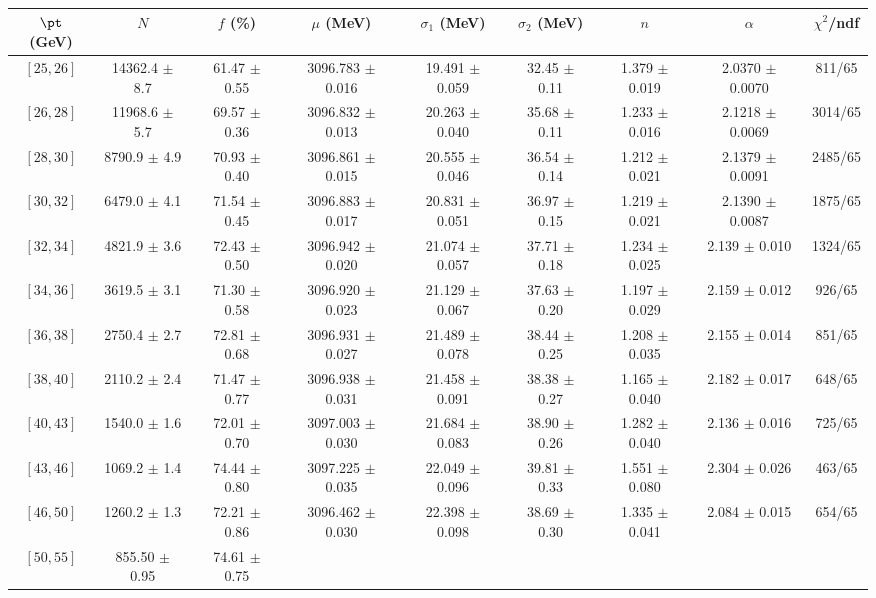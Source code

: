 \begin{tabular}{c||c|c|c|c|c|c|c||c}
$\pt$ (GeV) & $N$ & $f$ (\%) & $\mu$ (MeV) & $\sigma_1$ (MeV) & $\sigma_2$ (MeV) & $n$ &  $\alpha$ & $\chi^2$/ndf \\
\hline
$[25, 26]$ & 14362.4 $\pm$ 8.7 & 
61.47 $\pm$ 0.55 & 
3096.783 $\pm$ 0.016 & 
19.491 $\pm$ 0.059 & 
32.45 $\pm$ 0.11 & 
1.379 $\pm$ 0.019 & 
2.0370 $\pm$ 0.0070 & 
811/65\\
$[26, 28]$ & 11968.6 $\pm$ 5.7 & 
69.57 $\pm$ 0.36 & 
3096.832 $\pm$ 0.013 & 
20.263 $\pm$ 0.040 & 
35.68 $\pm$ 0.11 & 
1.233 $\pm$ 0.016 & 
2.1218 $\pm$ 0.0069 & 
3014/65\\
$[28, 30]$ & 8790.9 $\pm$ 4.9 & 
70.93 $\pm$ 0.40 & 
3096.861 $\pm$ 0.015 & 
20.555 $\pm$ 0.046 & 
36.54 $\pm$ 0.14 & 
1.212 $\pm$ 0.021 & 
2.1379 $\pm$ 0.0091 & 
2485/65\\
$[30, 32]$ & 6479.0 $\pm$ 4.1 & 
71.54 $\pm$ 0.45 & 
3096.883 $\pm$ 0.017 & 
20.831 $\pm$ 0.051 & 
36.97 $\pm$ 0.15 & 
1.219 $\pm$ 0.021 & 
2.1390 $\pm$ 0.0087 & 
1875/65\\
$[32, 34]$ & 4821.9 $\pm$ 3.6 & 
72.43 $\pm$ 0.50 & 
3096.942 $\pm$ 0.020 & 
21.074 $\pm$ 0.057 & 
37.71 $\pm$ 0.18 & 
1.234 $\pm$ 0.025 & 
2.139 $\pm$ 0.010 & 
1324/65\\
$[34, 36]$ & 3619.5 $\pm$ 3.1 & 
71.30 $\pm$ 0.58 & 
3096.920 $\pm$ 0.023 & 
21.129 $\pm$ 0.067 & 
37.63 $\pm$ 0.20 & 
1.197 $\pm$ 0.029 & 
2.159 $\pm$ 0.012 & 
926/65\\
$[36, 38]$ & 2750.4 $\pm$ 2.7 & 
72.81 $\pm$ 0.68 & 
3096.931 $\pm$ 0.027 & 
21.489 $\pm$ 0.078 & 
38.44 $\pm$ 0.25 & 
1.208 $\pm$ 0.035 & 
2.155 $\pm$ 0.014 & 
851/65\\
$[38, 40]$ & 2110.2 $\pm$ 2.4 & 
71.47 $\pm$ 0.77 & 
3096.938 $\pm$ 0.031 & 
21.458 $\pm$ 0.091 & 
38.38 $\pm$ 0.27 & 
1.165 $\pm$ 0.040 & 
2.182 $\pm$ 0.017 & 
648/65\\
$[40, 43]$ & 1540.0 $\pm$ 1.6 & 
72.01 $\pm$ 0.70 & 
3097.003 $\pm$ 0.030 & 
21.684 $\pm$ 0.083 & 
38.90 $\pm$ 0.26 & 
1.282 $\pm$ 0.040 & 
2.136 $\pm$ 0.016 & 
725/65\\
$[43, 46]$ & 1069.2 $\pm$ 1.4 & 
74.44 $\pm$ 0.80 & 
3097.225 $\pm$ 0.035 & 
22.049 $\pm$ 0.096 & 
39.81 $\pm$ 0.33 & 
1.551 $\pm$ 0.080 & 
2.304 $\pm$ 0.026 & 
463/65\\
$[46, 50]$ & 1260.2 $\pm$ 1.3 & 
72.21 $\pm$ 0.86 & 
3096.462 $\pm$ 0.030 & 
22.398 $\pm$ 0.098 & 
38.69 $\pm$ 0.30 & 
1.335 $\pm$ 0.041 & 
2.084 $\pm$ 0.015 & 
654/65\\
$[50, 55]$ & 855.50 $\pm$ 0.95 & 
74.61 $\pm$ 0.75 & 

\end{tabular}
